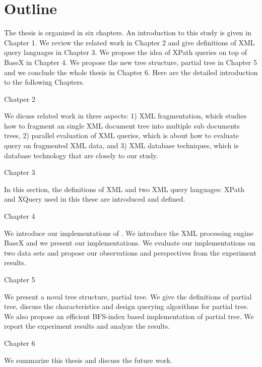 \section{Outline}

The thesis is organized in six chapters. An introduction to this study is given
in Chapter 1. We  review the  related work in Chapter 2 and give definitions of
XML query languages in Chapter 3. We propose the idea of XPath queries on top of
BaseX in Chapter 4. We propose the new tree structure, partial tree in Chapter 5
and  we conclude the whole thesis in Chapter 6. Here are the detailed
introduction to the following Chapters.

Chatper 2

We dicuss related work in three aspects: 1) XML fragmentation, which studies how
to fragment an single XML document tree into multiple sub documents trees, 2)
parallel evaluation of XML queries, which is about how to evaluate query on
fragmented XML data, and  3) XML database techniques, which is database
technology that are  closely to our study.

Chapter 3

In this section, the definitions of XML and two XML query languages: XPath and
XQuery used in this these are introduced and defined. 

Chapter 4

We introduce our implementations of \cite{BoLS09}.  We introduce the XML
processing engine BaseX and we present our implementations. We evaluate our
implementations on two data sets and propose our observations and perspectives
from the experiment results.

Chapter 5

We present a noval tree structure, partial tree. We give the definitions of
partial tree, discuss the characteristics and design querying algorithms for
partial tree. We also propose an efficient BFS-index based implementation of
partial tree. We report the experiment results and analyze the results.

Chapter 6

We summarize this thesis and discuss the future work.
